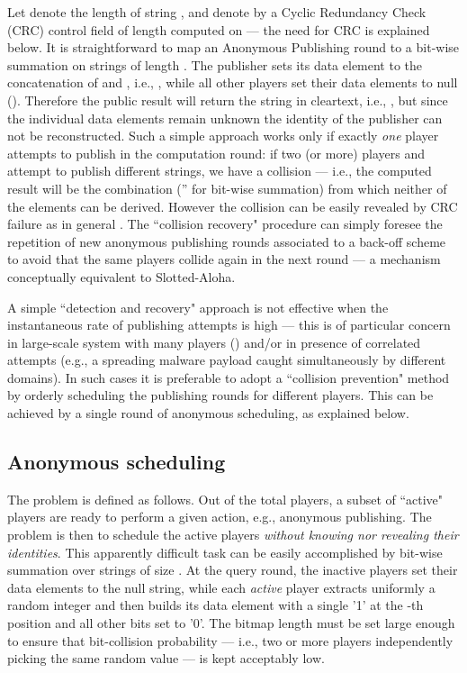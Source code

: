 \documentclass{sig-alternate}
\begin{document}
Let  denote the length of string , and denote by  a Cyclic Redundancy Check (CRC) control field of length  computed on  --- the need for CRC is explained below.
It is straightforward to map an Anonymous Publishing round to a bit-wise summation on strings of length .
The publisher  sets its data element to the concatenation of  and , i.e., , while all other players
set their data elements to null ().
Therefore the public result will return the string  in cleartext, i.e., , but since the individual data elements remain unknown the identity of the publisher can not be reconstructed.
Such a simple approach works only if exactly {\em one} player attempts to publish in the computation round: if two (or more) players  and  attempt to publish different strings, we have a collision --- i.e., the computed result will be the combination  ('' for bit-wise summation) from which neither of the elements  can be derived. However the collision can be easily revealed by CRC failure as in general .
The ``collision recovery" procedure can simply foresee the repetition of new anonymous publishing rounds associated to a back-off scheme to avoid that the same players collide again in the next round --- a mechanism conceptually equivalent to Slotted-Aloha.


A simple ``detection and recovery" approach is not effective when   
the instantaneous rate of publishing attempts is high --- this is of particular concern in large-scale system with many players () and/or in presence of correlated attempts (e.g., a spreading malware payload caught simultaneously by different domains).   
In such cases it is preferable to adopt a ``collision prevention" method by 
orderly scheduling the publishing rounds for different players.
This can be achieved by a single round of anonymous scheduling, as explained below. 



\subsection{Anonymous scheduling}\label{sec:scheduling}
The problem is defined as follows. 
Out of the total  players, a subset of  ``active" players are ready to perform a given action, e.g., anonymous publishing. 
The problem is then to schedule the  active players {\em without knowing nor revealing their identities}. 
This apparently difficult task can be easily accomplished by bit-wise summation over strings of size . At the query round, the inactive players set their data elements to the null string, while each {\em active} player  extracts uniformly a random integer  
and then builds its data element  with a single '1' at the -th position and all other bits set to '0'. 
The bitmap length  must be set large enough to ensure that bit-collision probability --- i.e.,  two or more players independently picking the same random value  --- is kept acceptably low. 
  
\end{document}
